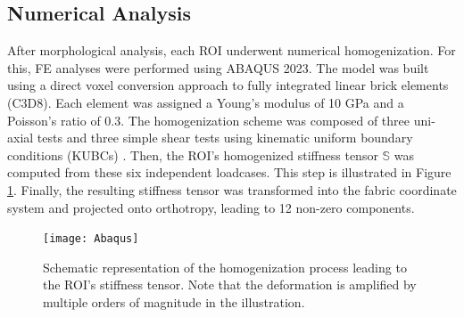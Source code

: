 \documentclass[a4paper,fleqn]{DC_ArtStyle}
\begin{document}
	\subsection{Numerical Analysis}
	After morphological analysis, each ROI underwent numerical homogenization.
	For this, \textmu FE analyses were performed using ABAQUS 2023.
	The model was built using a direct voxel conversion approach to fully integrated linear brick elements (C3D8).
	Each element was assigned a Young's modulus of 10 GPa and a Poisson's ratio of 0.3.
	The homogenization scheme was composed of three uni-axial tests and three simple shear tests using kinematic uniform boundary conditions (KUBCs) \cite{Panyasantisuk2015}.
	Then, the ROI's homogenized stiffness tensor $\mathbb{S}$ was computed from these six independent loadcases.
	This step is illustrated in Figure \ref{FigHomogenization}.
	Finally, the resulting stiffness tensor was transformed into the fabric coordinate system and projected onto orthotropy, leading to 12 non-zero components.

	\begin{figure}
		\texttt{[image: Abaqus]}
		\caption{Schematic representation of the homogenization process leading to the ROI's stiffness tensor.
				 Note that the deformation is amplified by multiple orders of magnitude in the illustration.}
		\label{FigHomogenization}
	\end{figure}
\end{document}
